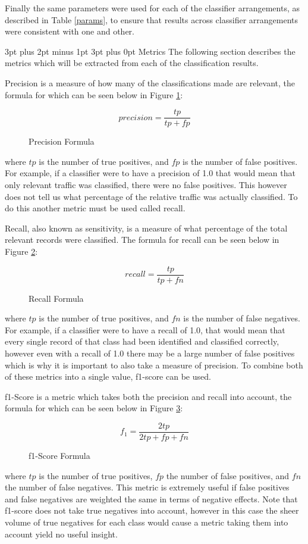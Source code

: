 \documentclass[12pt,a4paper]{article}
\makeatletter
\renewcommand\subsection{\@startsection {subsection}{1}{2mm} %
      {3pt plus 2pt minus 1pt} %
      {3pt plus 0pt} %
      {\normalfont\bfseries}}
\makeatother
\begin{document}
Finally the same parameters were used for each of the classifier arrangements, as described in Table \ref{params}, to ensure that results across classifier arrangements were consistent with one and other.

\subsection{Metrics}
The following section describes the metrics which will be extracted from each of the classification results.

Precision is a measure of how many of the classifications made are relevant, the formula for which can be seen below in Figure \ref{precision}:
\begin{figure}[H]
\[ precision = \frac{tp}{tp+fp} \]
\caption{Precision Formula}
\label{precision}
\end{figure}
where $tp$ is the number of true positives, and $fp$ is the number of false positives. For example, if a classifier were to have a precision of 1.0 that would mean that only relevant traffic was classified, there were no false positives. This however does not tell us what percentage of the relative traffic was actually classified. To do this another metric must be used called recall.

Recall, also known as sensitivity, is a measure of what percentage of the total relevant records were classified. The formula for recall can be seen below in Figure \ref{recall}:
\begin{figure}[H]
\[ recall = \frac{tp}{tp+fn} \]
\caption{Recall Formula}
\label{recall}
\end{figure}
where $tp$ is the number of true positives, and $fn$ is the number of false negatives. For example, if a classifier were to have a recall of 1.0, that would mean that every single record of that class had been identified and classified correctly, however even with a recall of 1.0 there may be a large number of false positives which is why it is important to also take a measure of precision. To combine both of these metrics into a single value, f1-score can be used.

f1-Score is a metric which takes both the precision and recall into account, the formula for which can be seen below in Figure \ref{f1}:
\begin{figure}[H]
\[ f_1 = \frac{2tp}{2tp+fp+fn} \]
\caption{f1-Score Formula}
\label{f1}
\end{figure}

where $tp$ is the number of true positives, $fp$ the number of false positives, and $fn$ the number of false negatives. This metric is extremely useful if false positives and false negatives are weighted the same in terms of negative effects. Note that f1-score does not take true negatives into account, however in this case the sheer volume of true negatives for each class would cause a metric taking them into account yield no useful insight.
\end{document}
